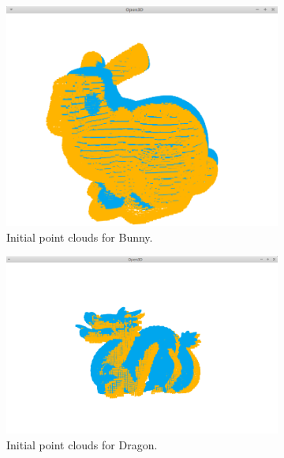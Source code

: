 \documentclass{article}
\begin{document}
\begin{figure}[h!]
    \centering
    \begin{subfigure}[b]{0.3\textwidth}
        \includegraphics[width=\textwidth]{bunny1.png}
        \caption{Initial point clouds for Bunny.}
    \end{subfigure}
    \begin{subfigure}[b]{0.3\textwidth}
        \includegraphics[width=\textwidth]{dragon1.png}
        \caption{Initial point clouds for Dragon.}
    \end{subfigure}
    \begin{subfigure}[b]{0.3\textwidth}

\end{subfigure}
\end{figure}
\end{document}
